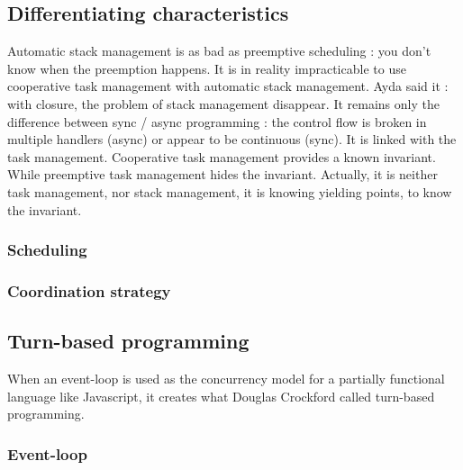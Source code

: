 \subsection{Differentiating characteristics}

Automatic stack management is as bad as preemptive scheduling : you don't know when the preemption happens.
It is in reality impracticable to use cooperative task management with automatic stack management.
Ayda said it : with closure, the problem of stack management disappear.
It remains only the difference between sync / async programming : the control flow is broken in multiple handlers (async) or appear to be continuous (sync).
It is linked with the task management.
Cooperative task management provides a known invariant.
While preemptive task management hides the invariant.
Actually, it is neither task management, nor stack management, it is knowing yielding points, to know the invariant.

\subsubsection{Scheduling}

\subsubsection{Coordination strategy}

\subsection{Turn-based programming}

When an event-loop is used as the concurrency model for a partially functional language like Javascript, it creates what Douglas Crockford called turn-based programming.

\subsubsection{Event-loop}

